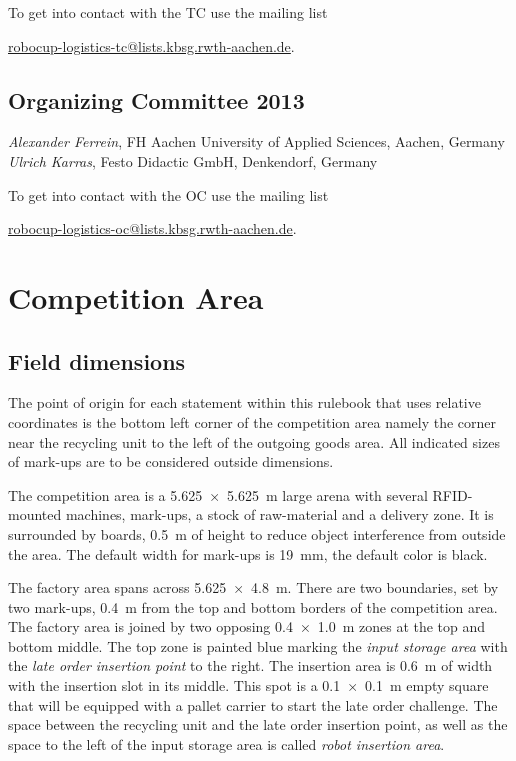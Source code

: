 \documentclass[12pt,twoside]{article}
\begin{document}
\medskip

\noindent
To get into contact with the TC use the mailing list\\
\centerline{\url{robocup-logistics-tc@lists.kbsg.rwth-aachen.de}.}

\subsection{Organizing Committee 2013} \label{sec:oc} \emph{Alexander
  Ferrein}, FH Aachen University of Applied Sciences,
Aachen, Germany\\
\emph{Ulrich Karras}, Festo Didactic GmbH, Denkendorf, Germany

\medskip

\noindent
To get into contact with the OC use the mailing list\\
\centerline{\url{robocup-logistics-oc@lists.kbsg.rwth-aachen.de}.}




\section{Competition Area} \label{sec:area}


\subsection{Field dimensions} \label{sec:competition-area}
The point of origin for each statement within this rulebook that uses
relative coordinates is the bottom left corner of the competition area
namely the corner near the recycling unit to the left of the outgoing
goods area. All indicated sizes of mark-ups are to be considered
outside dimensions.

The competition area is a \SI{5.625 x 5.625}{\metre} large arena with
several RFID-mounted machines, mark-ups, a stock of raw-material and a
delivery zone. It is surrounded by boards, \SI{0.5}{\metre} of height to reduce
object interference from outside the area. The default width for
mark-ups is \SI{19}{\milli\metre}, the default color is black.

The factory area spans across \SI{5.625 x 4.8}{\metre}. There are two
boundaries, set by two mark-ups, \SI{0.4}{\metre} from the top and
bottom borders of the competition area. The factory area is joined by
two opposing \SI{0.4 x 1.0}{\metre} zones at the top and bottom
middle. The top zone is painted blue marking the \textit{input storage
  area} with the \textit{late order insertion point} to the right. The
insertion area is \SI{0.6}{\metre} of width with the insertion slot in
its middle. This spot is a \SI{0.1 x 0.1}{\metre} empty square that
will be equipped with a pallet carrier to start the late order
challenge. The space between the recycling unit and the late order
insertion point, as well as the space to the left of the input storage
area is called \textit{robot insertion area}.
\end{document}
